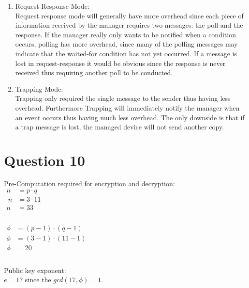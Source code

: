 \documentclass[fleqn, 12pt]{article}
\begin{document}
\begin{enumerate}
    \item
        Request-Response Mode:\\

        Request response mode will generally have more overhead since each piece of information received by the manager requires two messages: the poll and the response. If the manager really only wants to be notified when a condition occurs, polling has more overhead, since many of the polling messages may indicate that the waited-for condition has not yet occurred. If a message is lost in request-response it would be obvious since the response is never received thus requiring another poll to be conducted.

    \item
        Trapping Mode:\\

        Trapping only required the single message to the sender thus having less overhead. Furthermore Trapping will immediately notify the manager when an event occurs thus having much less overhead. The only downside is that if a trap message is lost, the managed device will not send another copy.
\end{enumerate}

\section*{Question 10}

Pre-Computation required for encryption and decryption:\\

$
    \begin{aligned}
        n &= p \cdot q\\\
        n &= 3 \cdot 11\\
        n &= 33\\
    \end{aligned}
$\\\\

$
    \begin{aligned}
        \phi &= (p-1) \cdot (q-1)\\
        \phi &= (3-1) \cdot (11-1)\\
        \phi &= 20\\
    \end{aligned}
$\\\\

Public key exponent:\\
$e = 17$ since the $gcd(17, \phi) = 1$.\\
\end{document}
